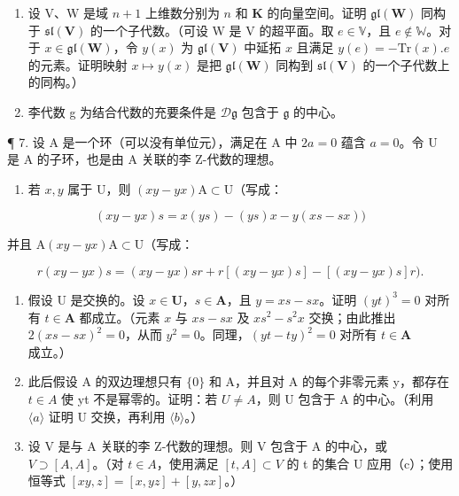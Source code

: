 \begin{enumerate}
\def\labelenumi{\arabic{enumi}.}
\setcounter{enumi}{4}
\item
  设 \(\mathrm{V}\)、\(\mathrm{W}\) 是域 \(n + 1\) 上维数分别为 \(n\) 和 \(\mathbf{K}\) 的向量空间。证明 \(\mathfrak{gl}(\mathbf{W})\) 同构于 \(\mathfrak{sl}(\mathbf{V})\) 的一个子代数。（可设 W 是 \(\mathrm{V}\) 的超平面。取 \(e \in \mathbb{V}\)，且 \(e \notin \mathbb{W}\)。对于 \(x \in \mathfrak{gl}(\mathbf{W})\)，令 \(y(x)\) 为 \(\mathfrak{gl}(\mathbf{V})\) 中延拓 \(x\) 且满足 \(y(e) = -\mathrm{Tr}(x).e\) 的元素。证明映射 \(x \mapsto y(x)\) 是把 \(\mathfrak{gl}(\mathbf{W})\) 同构到 \(\mathfrak{sl}(\mathbf{V})\) 的一个子代数上的同构。）
\item
  李代数 g 为结合代数的充要条件是 \(\mathcal{D}\mathfrak{g}\) 包含于 \(\mathfrak{g}\) 的中心。
\end{enumerate}

¶ 7. 设 A 是一个环（可以没有单位元），满足在 A 中 \(2a = 0\) 蕴含 \(a = 0\)。令 U 是 A 的子环，也是由 A 关联的李 Z-代数的理想。

\begin{enumerate}
\def\labelenumi{(\alph{enumi})}
\tightlist
\item
  若 \(x, y\) 属于 U，则 \((xy - yx)\mathrm{A} \subset \mathrm{U}\)（写成：
\end{enumerate}

\[
(x y - y x) s = x (y s) - (y s) x - y (x s - s x))
\]

并且 \(\mathrm{A}(xy - yx)\mathrm{A} \subset \mathrm{U}\)（写成：

\[
r (x y - y x) s = (x y - y x) s r + r [ (x y - y x) s ] - [ (x y - y x) s ] r).
\]

\begin{enumerate}
\def\labelenumi{(\alph{enumi})}
\setcounter{enumi}{1}
\item
  假设 U 是交换的。设 \(x \in \mathbf{U}\)，\(s \in \mathbf{A}\)，且 \(y = xs - sx\)。证明 \((yt)^3 = 0\) 对所有 \(t \in \mathbf{A}\) 都成立。（元素 \(x\) 与 \(xs - sx\) 及 \(xs^2 - s^2x\) 交换；由此推出 \(2(xs - sx)^2 = 0\)，从而 \(y^2 = 0\)。同理，\((yt - ty)^2 = 0\) 对所有 \(t \in \mathbf{A}\) 成立。）
\item
  此后假设 A 的双边理想只有 \(\{0\}\) 和 A，并且对 A 的每个非零元素 y，都存在 \(t \in A\) 使 yt 不是幂零的。证明：若 \(U \neq A\)，则 U 包含于 A 的中心。（利用 \(\langle a\rangle\) 证明 U 交换，再利用 \(\langle b\rangle\)。）
\item
  设 V 是与 A 关联的李 Z-代数的理想。则 V 包含于 A 的中心，或 \(V \supset [A, A]\)。（对 \(t \in A\)，使用满足 \([t, A] \subset V\) 的 t 的集合 U 应用（c）；使用恒等式 \([xy, z] = [x, yz] + [y, zx]\)。）
\end{enumerate}

